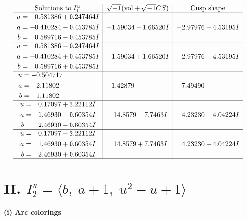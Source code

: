 \documentclass[1p]{elsarticle_modified}
\theoremstyle{definition}
\newcommand{\I}{\sqrt{-1}}
\begin{document}
$$\begin{array}{c|c|c}  
\text{Solutions to }I^u_{1}& \I (\text{vol} + \sqrt{-1}CS) & \text{Cusp shape}\\
 \hline 
\begin{aligned}
u &= \phantom{-}0.581386 + 0.247464 I \\
a &= -0.410284 - 0.453785 I \\
b &= \phantom{-}0.589716 - 0.453785 I\end{aligned}
 & -1.59034 - 1.66520 I & -2.97976 + 4.53195 I \\ \hline\begin{aligned}
u &= \phantom{-}0.581386 - 0.247464 I \\
a &= -0.410284 + 0.453785 I \\
b &= \phantom{-}0.589716 + 0.453785 I\end{aligned}
 & -1.59034 + 1.66520 I & -2.97976 - 4.53195 I \\ \hline\begin{aligned}
u &= -0.504717\phantom{ +0.000000I} \\
a &= -2.11802\phantom{ +0.000000I} \\
b &= -1.11802\phantom{ +0.000000I}\end{aligned}
 & \phantom{-}1.42879\phantom{ +0.000000I} & \phantom{-}7.49490\phantom{ +0.000000I} \\ \hline\begin{aligned}
u &= \phantom{-}0.17097 + 2.22112 I \\
a &= \phantom{-}1.46930 - 0.60354 I \\
b &= \phantom{-}2.46930 - 0.60354 I\end{aligned}
 & \phantom{-}14.8579 - 7.7463 I & \phantom{-}4.23230 + 4.04224 I \\ \hline\begin{aligned}
u &= \phantom{-}0.17097 - 2.22112 I \\
a &= \phantom{-}1.46930 + 0.60354 I \\
b &= \phantom{-}2.46930 + 0.60354 I\end{aligned}
 & \phantom{-}14.8579 + 7.7463 I & \phantom{-}4.23230 - 4.04224 I\\
 \hline 
 \end{array}$$\newpage\newpage\renewcommand{\arraystretch}{1}
\centering \section*{II. $I^u_{2}= \langle b,\;a+1,\;u^2- u+1 \rangle$}
\flushleft \textbf{(i) Arc colorings}\\
\end{document}
